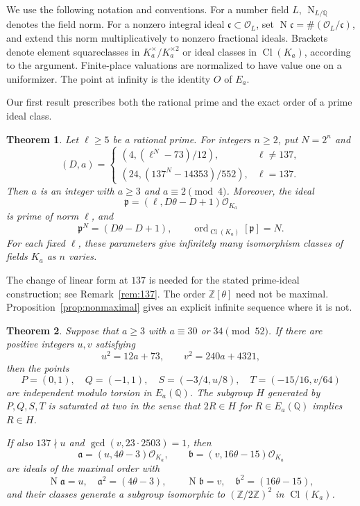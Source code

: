 \documentclass[draft]{publmathdeb}
\newtheorem{theorem}{Theorem}[section]
\theoremstyle{remark}
\numberwithin{equation}{section}
\newcommand{\Q}{\mathbb Q}
\newcommand{\Z}{\mathbb Z}
\DeclareMathOperator{\Cl}{Cl}
\DeclareMathOperator{\Nm}{N}
\DeclareMathOperator{\ord}{ord}
\begin{document}
We use the following notation and conventions. For a number field $L$, $\Nm_{L/\Q}$ denotes the field norm. For a nonzero integral ideal $\mathfrak c\subset\mathcal O_L$, set $\Nm\mathfrak c=\#(\mathcal O_L/\mathfrak c)$, and extend this norm multiplicatively to nonzero fractional ideals. Brackets denote element squareclasses in $K_a^\times/K_a^{\times2}$ or ideal classes in $\Cl(K_a)$, according to the argument. Finite-place valuations are normalized to have value one on a uniformizer. The point at infinity is the identity $O$ of $E_a$.

Our first result prescribes both the rational prime and the exact order of a prime ideal class.

\begin{samepage}
  \begin{theorem}\label{thm:prescribed-prime}
    Let $\ell\geq5$ be a rational prime. For integers $n\geq2$, put $N=2^n$ and
    \[
      (D,a)=
      \begin{cases}
        \left(4,(\ell^N-73)/12\right),     & \ell\ne137, \\[2pt]
        \left(24,(137^N-14353)/552\right), & \ell=137.
      \end{cases}
    \]
    Then $a$ is an integer with $a\geq3$ and $a\equiv2\pmod4$. Moreover, the ideal
    \[
      \mathfrak p=(\ell,D\theta-D+1)\mathcal O_{K_a}
    \]
    is prime of norm $\ell$, and
    \[
      \mathfrak p^N=(D\theta-D+1),\qquad
      \ord_{\Cl(K_a)}[\mathfrak p]=N.
    \]
    For each fixed $\ell$, these parameters give infinitely many isomorphism classes of fields $K_a$ as $n$ varies.
  \end{theorem}
\end{samepage}

The change of linear form at $137$ is needed for the stated prime-ideal construction; see Remark~\ref{rem:137}. The order $\Z[\theta]$ need not be maximal. Proposition~\ref{prop:nonmaximal} gives an explicit infinite sequence where it is not.

\begin{theorem}\label{thm:four-points}
  Suppose that $a\geq3$ with $a\equiv30$ or $34\pmod{52}$. If there are positive integers $u,v$ satisfying
  \begin{equation}\label{eq:two-squares}
    u^2=12a+73,\qquad v^2=240a+4321,
  \end{equation}
  then the points
  \[
    P=(0,1),\quad Q=(-1,1),\quad
    S=(-3/4,u/8),\quad T=(-15/16,v/64)
  \]
  are independent modulo torsion in $E_a(\Q)$. The subgroup $H$ generated by $P,Q,S,T$ is saturated at two in the sense that $2R\in H$ for $R\in E_a(\Q)$ implies $R\in H$.

  If also $137\nmid u$ and $\gcd(v,23\cdot2503)=1$, then
  \[
    \mathfrak a=(u,4\theta-3)\mathcal O_{K_a},\qquad
    \mathfrak b=(v,16\theta-15)\mathcal O_{K_a}
  \]
  are ideals of the maximal order with
  \[
    \Nm\mathfrak a=u,\quad \mathfrak a^2=(4\theta-3),\qquad
    \Nm\mathfrak b=v,\quad \mathfrak b^2=(16\theta-15),
  \]
  and their classes generate a subgroup isomorphic to $(\Z/2\Z)^2$ in $\Cl(K_a)$.
\end{theorem}
\end{document}
